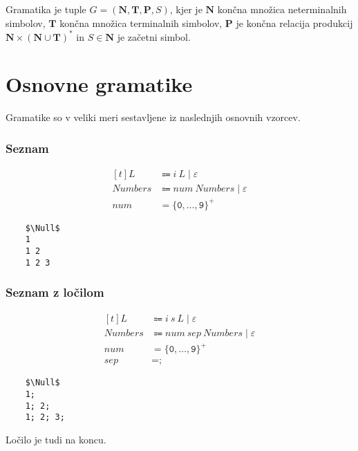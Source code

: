 \documentclass{report}
\newcommand{\Null}{\varepsilon}
\newcommand{\Char}[1]{\texttt{#1}}
\newcommand{\Spc}{\ }
\newcommand{\Union}{\mathrel{|}}
\newcommand{\Kleene}[1]{{#1}^\ast}
\newcommand{\KleenePlus}[1]{#1^+}
\newcommand{\Set}[1]{\symbf{#1}}
\newcommand{\Terminals}{\Set{T}}
\newcommand{\Productions}{\Set{P}}
\newcommand{\NonTerminals}{\Set{N}}
\newcommand{\Arrow}{\Coloneq}
\newcommand{\NT}[1]{{#1}}
\newcommand{\T}[1]{{#1}}
\begin{document}
  Gramatika je tuple $G = (\NonTerminals, \Terminals, \Productions, \NT{S})$, kjer je $\NonTerminals$ končna množica neterminalnih simbolov, $\Terminals$ končna množica terminalnih simbolov, $\Productions$ je končna relacija produkcij $\NonTerminals \times \Kleene{(\NonTerminals \cup \Terminals)}$ in $\NT{S} \in \NonTerminals$ je začetni simbol.

  \section{Osnovne gramatike} 
    Gramatike so v veliki meri sestavljene iz naslednjih osnovnih vzorcev.

    \subsubsection{Seznam}
    \begin{equation*}
      \begin{aligned}[t]
        \NT{L} &\Arrow \T{i} \Spc \NT{L} \Union \Null\\[1em]
        \NT{Numbers} &\Arrow \T{num} \Spc \NT{Numbers} \Union \Null\\[1em]
        \T{num} &= \KleenePlus{\{\Char{0}, \dots, \Char{9}\}}
      \end{aligned}
    \end{equation*}
    \begin{lstlisting}
    $\Null$
    1
    1 2
    1 2 3
    \end{lstlisting}

    \subsubsection{Seznam z ločilom}
    \begin{equation*}
      \begin{aligned}[t]
        \NT{L} &\Arrow \T{i} \Spc \T{s} \Spc \NT{L} \Union \Null\\[1em]
        \NT{Numbers} &\Arrow \T{num} \Spc \T{sep} \Spc \NT{Numbers} \Union \Null\\[1em]
        \T{num} &= \KleenePlus{\{\Char{0}, \dots, \Char{9}\}}\\
        \T{sep} &= \Char{;}
      \end{aligned}
    \end{equation*}
    \begin{lstlisting}
    $\Null$
    1;
    1; 2;
    1; 2; 3;
    \end{lstlisting}
    Ločilo je tudi na koncu.
\end{document}

